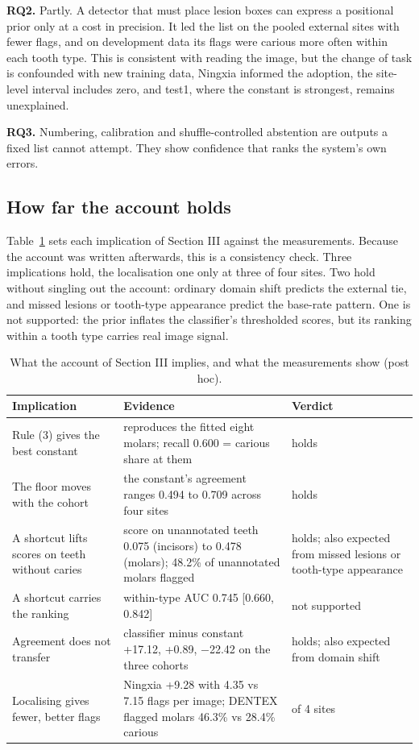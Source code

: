 \documentclass[conference]{IEEEtran}
\begin{document}
\textbf{RQ2.} Partly. A detector that must place lesion boxes can express a positional prior only at a cost in precision. It led the list on the pooled external sites with fewer flags, and on development data its flags were carious more often within each tooth type. This is consistent with reading the image, but the change of task is confounded with new training data, Ningxia informed the adoption, the site-level interval includes zero, and test1, where the constant is strongest, remains unexplained.

\textbf{RQ3.} Numbering, calibration and shuffle-controlled abstention are outputs a fixed list cannot attempt. They show confidence that ranks the system's own errors.

\subsection{How far the account holds}

Table~\ref{tab:6} sets each implication of Section III against the measurements. Because the account was written afterwards, this is a consistency check. Three implications hold, the localisation one only at three of four sites. Two hold without singling out the account: ordinary domain shift predicts the external tie, and missed lesions or tooth-type appearance predict the base-rate pattern. One is not supported: the prior inflates the classifier's thresholded scores, but its ranking within a tooth type carries real image signal.

\begin{table}[t]
\centering
\caption{What the account of Section III implies, and what the measurements show (post hoc).}
\label{tab:6}
\footnotesize
\setlength{\tabcolsep}{3pt}
\begin{tabular}{>{\raggedright\arraybackslash}p{4.17cm}>{\raggedright\arraybackslash}p{7.24cm}>{\raggedright\arraybackslash}p{5.32cm}}
\toprule
Implication & Evidence & Verdict \\
\midrule
Rule (3) gives the best constant & reproduces the fitted eight molars; recall 0.600 = carious share at them & holds \\
The floor moves with the cohort & the constant's agreement ranges 0.494 to 0.709 across four sites & holds \\
A shortcut lifts scores on teeth without caries & score on unannotated teeth 0.075 (incisors) to 0.478 (molars); 48.2\% of unannotated molars flagged & holds; also expected from missed lesions or tooth-type appearance \\
A shortcut carries the ranking & within-type AUC 0.745 [0.660, 0.842] & not supported \\
Agreement does not transfer & classifier minus constant +17.12, +0.89, $-$22.42 on the three cohorts & holds; also expected from domain shift \\
Localising gives fewer, better flags & Ningxia +9.28 with 4.35 vs 7.15 flags per image; DENTEX flagged molars 46.3\% vs 28.4\% carious & 3 of 4 sites \\
\bottomrule
\end{tabular}
\end{table}
\end{document}

